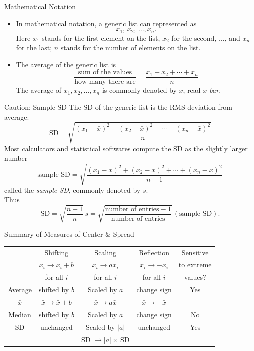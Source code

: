 \documentclass[
  ignorenonframetext,
]{beamer}
\newcommand{\red}[1]{\textit{\textcolor{rubineRed}{#1}}}
\newcommand{\hl}[1]{\textit{\textcolor{hlblue}{#1}}}
\begin{document}
\begin{frame}{Mathematical Notation}
\protect\hypertarget{mathematical-notation}{}
\begin{itemize}
\item
  In mathematical notation, a generic list can represented as
  \[x_1,\, x_2,\, \ldots, x_n.\] Here \(x_1\) stands for the first
  element on the list, \(x_2\) for the second, \(\ldots\), and \(x_n\)
  for the last; \(n\) stands for the number of elements on the list.
\item
  The average of the generic list is \[
  \frac{\text{sum of the values}}{\text{how many there are}}
  = \frac{x_1  + x_2 + \cdots + x_n}{n}
  \] The average of \(x_1,x_2,\ldots,x_n\) is commonly denoted by
  \(\bar x\), read \red{$x$-bar}.
\end{itemize}
\end{frame}

\begin{frame}{Caution: Sample SD}
\protect\hypertarget{caution-sample-sd}{}
The SD of the generic list is the RMS deviation from average: \[
\text{SD} = \sqrt {\frac{ (x_1 - \bar x)^2 + (x_2 - \bar x)^2 +
\cdots + (x_n - \bar x)^2}{n}} 
\] Most calculators and statistical softwares compute the SD as the
slightly larger number
\[\text{sample SD} = \sqrt {\frac{ (x_1 - \bar x)^2 + (x_2 - \bar x)^2 +
\cdots + (x_n - \bar x)^2}{n-1}} \] called the \hl{sample SD}, commonly
denoted by \red{$s$}.\\
Thus \[\text{SD} = \sqrt{\frac{n-1}{n}} \, s =
\sqrt{\frac{\text{number of entries}- 1}
    {\text{number of entries}}}\, (\text{sample SD}).
\]
\end{frame}

\begin{frame}{Summary of Measures of Center \& Spread}
\protect\hypertarget{summary-of-measures-of-center-spread}{}
\begin{tabular}{@{}c|cccc}
       & Shifting & Scaling & Reflection & Sensitive \\[-2pt]
       & $x_i\rightarrow x_i+b$ & $x_i\rightarrow ax_i$ & $x_i\rightarrow -x_i$ & to extreme \\
       & for all $i$ & for all $i$ & for all $i$ & values?\\
\toprule
Average   & shifted by $b$ & Scaled by $a$ & change sign & Yes\\
$\bar{x}$ & $\bar{x}\rightarrow \bar{x}+b$ & $\bar{x}\rightarrow a\bar{x}$ &$\bar{x}\rightarrow -\bar{x}$ &\\
\midrule
Median & shifted by $b$ & Scaled by $a$ & change sign & No\\
\midrule
SD     & unchanged      & Scaled by $|a|$ & unchanged & Yes\\
       &                & SD $\rightarrow |a|\times\,$SD&&
\end{tabular}
\end{frame}
\end{document}
